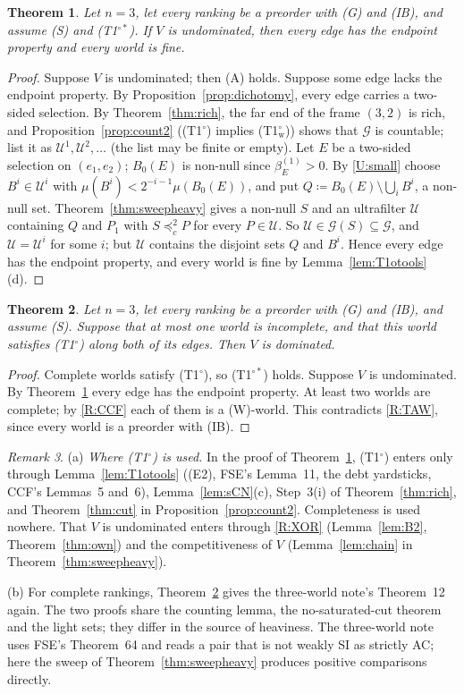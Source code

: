 \documentclass[11pt]{article}
\newtheorem{theorem}{Theorem}
\theoremstyle{definition}\newtheorem{definition}[theorem]{Definition}
\theoremstyle{remark}\newtheorem{remark}[theorem]{Remark}
\newcommand{\Uf}{\mathcal U}
\newcommand{\Tw}{\textup{(T1$^\circ_{\mathrm w}$)}}
\newcommand{\To}{\textup{(T1$^\circ$)}}
\newcommand{\Tos}{\textup{(T1$^{\circ*}$)}}
\begin{document}
\begin{theorem}\label{thm:A}
Let $n=3$, let every ranking be a preorder with (G) and (IB), and assume
(S) and \Tos. If $V$ is undominated, then every edge has the endpoint
property and every world is fine.
\end{theorem}
\begin{proof}
Suppose $V$ is undominated; then (A) holds. Suppose some edge lacks the
endpoint property. By Proposition~\ref{prop:dichotomy}, every edge carries a
two-sided selection. By Theorem~\ref{thm:rich}, the far end of the frame
$(3,2)$ is rich, and Proposition~\ref{prop:count2} (\To{} implies \Tw)
shows that $\mathcal G$ is countable; list it as $\Uf^1,\Uf^2,\dots$ (the
list may be finite or empty). Let $E$ be a two-sided selection on
$(e_1,e_2)$; $B_0(E)$ is non-null since $\beta^{(1)}_E>0$. By \ref{U:small}
choose $B^i\in\Uf^i$ with $\mu(B^i)<2^{-i-1}\mu(B_0(E))$, and put
$Q\coloneqq B_0(E)\setminus\bigcup_iB^i$, a non-null set.
Theorem~\ref{thm:sweepheavy} gives a non-null $S$ and an ultrafilter $\Uf$
containing $Q$ and $P_1$ with $S\preceq^2_cP$ for every $P\in\Uf$. So
$\Uf\in\mathcal G(S)\subseteq\mathcal G$, and $\Uf=\Uf^i$ for some $i$; but
$\Uf$ contains the disjoint sets $Q$ and $B^i$. Hence every edge has the
endpoint property, and every world is fine by
Lemma~\ref{lem:T1otools}(d).
\end{proof}

\begin{theorem}\label{thm:B}
Let $n=3$, let every ranking be a preorder with (G) and (IB), and assume
(S). Suppose that at most one world is incomplete, and that this world
satisfies \To{} along both of its edges. Then $V$ is dominated.
\end{theorem}
\begin{proof}
Complete worlds satisfy \To, so \Tos{} holds. Suppose $V$ is undominated.
By Theorem~\ref{thm:A} every edge has the endpoint property. At least two
worlds are complete; by \ref{R:CCF} each of them is a (W)-world. This
contradicts \ref{R:TAW}, since every world is a preorder with (IB).
\end{proof}

\begin{remark}\label{rem:AB}
(a) \emph{Where \To{} is used.} In the proof of Theorem~\ref{thm:A}, \To{}
enters only through Lemma~\ref{lem:T1otools} ((E2), FSE's Lemma~11, the debt
yardsticks, CCF's Lemmas~5 and~6), Lemma~\ref{lem:sCN}(c), Step~3(i) of
Theorem~\ref{thm:rich}, and Theorem~\ref{thm:cut} in
Proposition~\ref{prop:count2}. Completeness is used nowhere. That $V$ is
undominated enters through \ref{R:XOR} (Lemma~\ref{lem:B2},
Theorem~\ref{thm:own}) and the competitiveness of $V$
(Lemma~\ref{lem:chain} in Theorem~\ref{thm:sweepheavy}).

(b) For complete rankings, Theorem~\ref{thm:B} gives the three-world note's
Theorem~12 again. The two proofs share the counting lemma, the
no-saturated-cut theorem and the light sets; they differ in the source of
heaviness. The three-world note uses FSE's Theorem~64 and reads a pair that
is not weakly SI as strictly AC; here the sweep of
Theorem~\ref{thm:sweepheavy} produces positive comparisons directly.
\end{remark}
\end{document}
